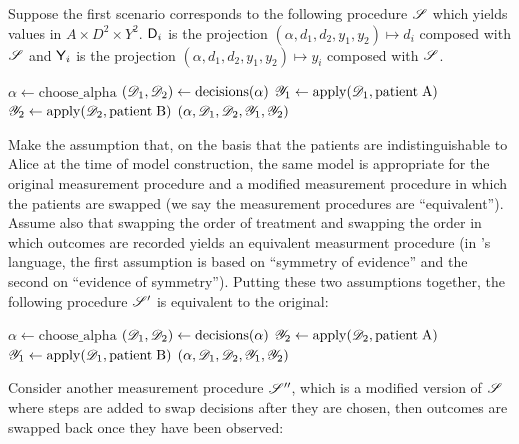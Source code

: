 Suppose the first scenario corresponds to the following procedure $\mathscr{S}$ which yields values in $A\times D^2\times Y^2$. $\mathsf{D}_i$ is the projection $(\alpha,d_1,d_2,y_1,y_2)\mapsto d_i$ composed with $\mathscr{S}$ and $\mathsf{Y}_i$ is the projection $(\alpha,d_1,d_2,y_1,y_2)\mapsto y_i$ composed with $\mathscr{S}$.
\begin{algorithmic}
    \State $\alpha \gets \mathrm{choose\_alpha}$
    \State $(\mathscr{D}_1,\mathscr{D}_2) \gets \mathrm{decisions}(\alpha)$
    \State $\mathscr{Y}_1\gets \mathrm{apply}(\mathscr{D}_1,\mathrm{patient\;A})$
    \State $\mathscr{Y}_2\gets \mathrm{apply}(\mathscr{D}_2,\mathrm{patient\;B})$
    \State \Return $(\alpha,\mathscr{D}_1,\mathscr{D}_2,\mathscr{Y}_1,\mathscr{Y}_2)$
    \EndProcedure
\end{algorithmic}


Make the assumption that, on the basis that the patients are indistinguishable to Alice at the time of model construction, the same model is appropriate for the original measurement procedure and a modified measurement procedure in which the patients are swapped (we say the measurement procedures are ``equivalent''). Assume also that swapping the order of treatment and swapping the order in which outcomes are recorded yields an equivalent measurment procedure (in \citet{walley_statistical_1991}'s language, the first assumption is based on ``symmetry of evidence'' and the second on ``evidence of symmetry''). Putting these two assumptions together, the following procedure $\mathscr{S}'$ is equivalent to the original:

\begin{algorithmic}
    \State $\alpha \gets \mathrm{choose\_alpha}$
    \State $(\mathscr{D}_1,\mathscr{D}_2) \gets \mathrm{decisions}(\alpha)$
    \State $\mathscr{Y}_2\gets \mathrm{apply}(\mathscr{D}_2,\mathrm{patient\;A})$
    \State $\mathscr{Y}_1\gets \mathrm{apply}(\mathscr{D}_1,\mathrm{patient\;B})$
    \State \Return $(\alpha,\mathscr{D}_1,\mathscr{D}_2,\mathscr{Y}_1,\mathscr{Y}_2)$
    \EndProcedure
\end{algorithmic}

Consider another measurement procedure $\mathscr{S}''$, which is a modified version of $\mathscr{S}$ where steps are added to swap decisions after they are chosen, then outcomes are swapped back once they have been observed:

